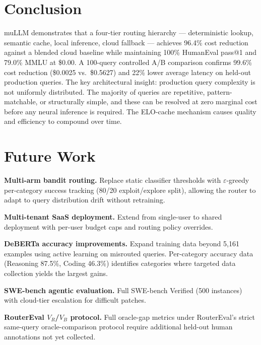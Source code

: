 \documentclass[11pt]{article}
\begin{document}
\section{Conclusion}

muLLM demonstrates that a four-tier routing hierarchy --- deterministic
lookup, semantic cache, local inference, cloud fallback --- achieves
96.4\% cost reduction against a blended cloud baseline while maintaining
100\% HumanEval pass@1 and 79.0\% MMLU at \$0.00. A 100-query
controlled A/B comparison confirms 99.6\% cost reduction (\$0.0025
vs.\ \$0.5627) and 22\% lower average latency on held-out production
queries. The key architectural insight: production query complexity is
not uniformly distributed. The majority of queries are repetitive,
pattern-matchable, or structurally simple, and these can be resolved at
zero marginal cost before any neural inference is required. The ELO-cache
mechanism causes quality and efficiency to compound over time.

\section{Future Work}

\textbf{Multi-arm bandit routing.} Replace static classifier thresholds
with $\varepsilon$-greedy per-category success tracking (80/20
exploit/explore split), allowing the router to adapt to query
distribution drift without retraining.

\textbf{Multi-tenant SaaS deployment.} Extend from single-user to shared
deployment with per-user budget caps and routing policy overrides.

\textbf{DeBERTa accuracy improvements.} Expand training data beyond
5,161 examples using active learning on misrouted queries. Per-category
accuracy data (Reasoning 87.5\%, Coding 46.3\%) identifies categories
where targeted data collection yields the largest gains.

\textbf{SWE-bench agentic evaluation.} Full SWE-bench Verified (500
instances) with cloud-tier escalation for difficult patches.

\textbf{RouterEval $V_R$/$V_B$ protocol.} Full oracle-gap metrics under
RouterEval's strict same-query oracle-comparison protocol require
additional held-out human annotations not yet collected.

\end{document}

